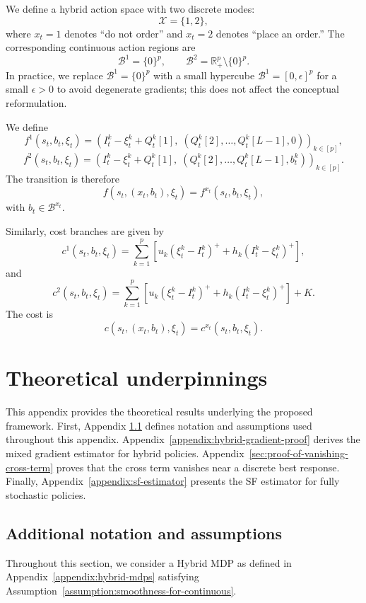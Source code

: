 \documentclass{article}
\theoremstyle{definition}
\theoremstyle{remark}
\begin{document}
We define a hybrid action space with two discrete modes:
\[
\mathcal{X} = \{1,2\},
\]
where $x_t = 1$ denotes ``do not order'' and $x_t = 2$ denotes ``place an order.''
The corresponding continuous action regions are
\[
\mathcal{B}^1 = \{0\}^p,
\qquad
\mathcal{B}^2 = \mathbb{R}_+^p \setminus \{0\}^p.
\]
In practice, we replace $\mathcal{B}^1 = \{0\}^p$ with a small hypercube
$\mathcal{B}^1 = [0,\epsilon]^p$ for a small $\epsilon > 0$ to avoid
degenerate gradients; this does not affect the conceptual reformulation.

We define
\[
f^1(s_t,b_t,\xi_t)
=
\left(
I_t^k - \xi_t^k + Q_t^k[1],\;
(Q_t^k[2],\ldots,Q_t^k[L-1],0)
\right)_{k \in [p]},
\]
\[
f^2(s_t,b_t,\xi_t)
=
\left(
I_t^k - \xi_t^k + Q_t^k[1],\;
(Q_t^k[2],\ldots,Q_t^k[L-1],b_t^{k})
\right)_{k \in [p]}.
\]
The transition is therefore
\[
f(s_t,(x_t,b_t),\xi_t)
=
f^{x_t}(s_t,b_t,\xi_t),
\]
with $b_t \in \mathcal{B}^{x_t}$.

Similarly, cost branches are given by
\[
c^1(s_t,b_t,\xi_t)
=
\sum_{k=1}^p
\left[
u_k(\xi_t^k - I_t^k)^+
+
h_k(I_t^k - \xi_t^k)^+
\right],
\]
and
\[
c^2(s_t,b_t,\xi_t)
=
\sum_{k=1}^p
\left[
u_k(\xi_t^k - I_t^k)^+
+
h_k(I_t^k - \xi_t^k)^+
\right]
+
K.
\]
The cost is
\[
c(s_t,(x_t,b_t),\xi_t)
=
c^{x_t}(s_t,b_t,\xi_t).
\]


\section{Theoretical underpinnings}
\label{appendix:theory}

This appendix provides the theoretical results underlying the proposed framework. First, Appendix \ref{appendix:notation-and-assumptions} defines notation and assumptions used throughout this appendix. Appendix~\ref{appendix:hybrid-gradient-proof} derives the mixed gradient estimator for hybrid policies. Appendix~\ref{sec:proof-of-vanishing-cross-term} proves that the cross term vanishes near a discrete best response. Finally, Appendix~\ref{appendix:sf-estimator} presents the SF estimator for fully stochastic policies.

\subsection{Additional notation and assumptions}
\label{appendix:notation-and-assumptions}

Throughout this section, we consider a Hybrid MDP as defined in 
Appendix~\ref{appendix:hybrid-mdps} satisfying 
Assumption~\ref{assumption:smoothness-for-continuous}.
\end{document}
